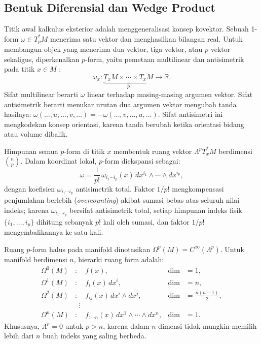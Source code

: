 \subsection{Bentuk Diferensial dan Wedge Product}
\label{subsec:forms-wedge}

Titik awal kalkulus eksterior adalah menggeneralisasi konsep kovektor. Sebuah 1-form $\omega \in T_p^*M$ menerima satu vektor dan menghasilkan bilangan real. Untuk membangun objek yang menerima dua vektor, tiga vektor, atau $p$ vektor sekaligus, diperkenalkan $p$-form, yaitu pemetaan multilinear dan antisimetrik pada titik $x \in M$ \cite{eguchi1980}:
\begin{equation}
    \omega_x : \underbrace{T_xM \times \cdots \times T_xM}_{p} \longrightarrow \mathbb{R}.
\end{equation}
Sifat multilinear berarti $\omega$ linear terhadap masing-masing argumen vektor. Sifat antisimetrik berarti menukar urutan dua argumen vektor mengubah tanda hasilnya: $\omega(\ldots, u, \ldots, v, \ldots) = -\omega(\ldots, v, \ldots, u, \ldots)$. Sifat antisimetri ini mengkodekan konsep orientasi, karena tanda berubah ketika orientasi bidang atau volume dibalik.

Himpunan semua $p$-form di titik $x$ membentuk ruang vektor $\Lambda^p T_x^*M$ berdimensi $\binom{n}{p}$. Dalam koordinat lokal, $p$-form diekspansi sebagai:
\begin{equation}\label{eq:p-form-coords}
    \omega = \frac{1}{p!}\, \omega_{i_1 \cdots i_p}(x)\, dx^{i_1} \wedge \cdots \wedge dx^{i_p},
\end{equation}
dengan koefisien $\omega_{i_1 \cdots i_p}$ antisimetrik total. Faktor $1/p!$ mengkompensasi penjumlahan berlebih (\textit{overcounting}) akibat sumasi bebas atas seluruh nilai indeks; karena $\omega_{i_1 \cdots i_p}$ bersifat antisimetrik total, setiap himpunan indeks fisik $\{i_1, \ldots, i_p\}$ dihitung sebanyak $p!$ kali oleh sumasi, dan faktor $1/p!$ mengembalikannya ke satu kali.

Ruang $p$-form halus pada manifold dinotasikan $\Omega^p(M) = C^\infty(\Lambda^p)$. Untuk manifold berdimensi $n$, hierarki ruang form adalah:
\begin{align}
    \Omega^0(M) &: \quad f(x), & \dim &= 1, \nonumber \\
    \Omega^1(M) &: \quad f_i(x)\, dx^i, & \dim &= n, \nonumber \\
    \Omega^2(M) &: \quad f_{ij}(x)\, dx^i \wedge dx^j, & \dim &= \tfrac{n(n-1)}{2}, \\
    &\;\;\vdots \nonumber \\
    \Omega^n(M) &: \quad f_{1\cdots n}(x)\, dx^1 \wedge \cdots \wedge dx^n, & \dim &= 1. \nonumber
\end{align}
Khususnya, $\Lambda^p = 0$ untuk $p > n$, karena dalam $n$ dimensi tidak mungkin memilih lebih dari $n$ buah indeks yang saling berbeda.

